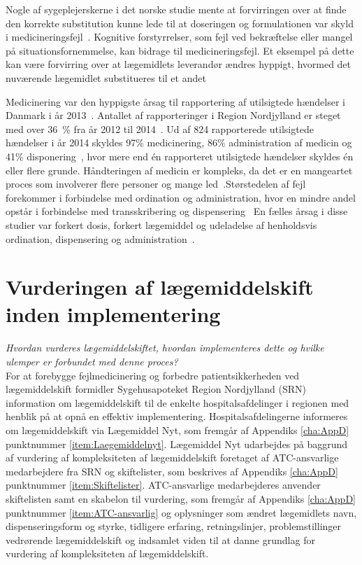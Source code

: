 Nogle af sygeplejerskerne i det norske studie mente at forvirringen over at finde den korrekte substitution kunne lede til at doseringen og formulationen var skyld i medicineringsfejl~\citep{Hakonsen2010}. Kognitive forstyrrelser, som fejl ved bekræftelse eller mangel på situationsfornemmelse, kan bidrage til medicineringsfejl. Et eksempel på dette kan være forvirring over at lægemidlets leverandør ændres hyppigt, hvormed det nuværende lægemidlet substitueres til et andet~\citep{Wittich2014}

Medicinering var den hyppigste årsag til rapportering af utilsigtede hændelser i Danmark i år 2013~\citep{Patientombuddet2013}. Antallet af rapporteringer i Region Nordjylland er steget med over 36~\% fra år 2012 til 2014~\citep{Jensen2014}. Ud af 824 rapporterede utilsigtede hændelser i år 2014 skyldes 97\% medicinering, 86\% administration af medicin og 41\% disponering~\citep{Jensen2014}, hvor mere end én rapporteret utilsigtede hændelser skyldes én eller flere grunde.  Håndteringen af medicin er kompleks, da det er en mangeartet proces som involverer flere personer og mange led~\citep{Barker2002,Sundhedsstyrelsen2005,Lisby2005, Tully2009}.Størstedelen af fejl forekommer i forbindelse med ordination og administration, hvor en mindre andel opstår i forbindelse med transskribering og dispensering~\citep{Agrawal2009, Anderson2002} En fælles årsag i disse studier var forkert dosis, forkert lægemiddel og udeladelse af henholdsvis ordination, dispensering og administration~\citep{Barker2002,Sundhedsstyrelsen2005,Lisby2005, Tully2009}.

\section{Vurderingen af lægemiddelskift inden implementering} \label{sec:ImpLaeg}
\textit{Hvordan vurderes lægemiddelskiftet, hvordan implementeres dette og hvilke ulemper er forbundet med denne proces?} \\
For at forebygge fejlmedicinering og forbedre patientsikkerheden ved lægemiddelskift formidler Sygehusapoteket Region Nordjylland (SRN) information om lægemiddelskift til de enkelte hospitalsafdelinger i regionen med henblik på at opnå en effektiv implementering. Hospitalsafdelingerne informeres om lægemiddelskift via Lægemiddel Nyt, som fremgår af Appendiks \ref{cha:AppD} punktnummer \ref{item:Laegemiddelnyt}. Lægemiddel Nyt udarbejdes på baggrund af vurdering af kompleksiteten af lægemiddelskift foretaget af ATC-ansvarlige medarbejdere fra SRN og skiftelister, som beskrives af Appendiks \ref{cha:AppD} punktnummer \ref{item:Skiftelister}. ATC-ansvarlige medarbejderes anvender skiftelisten samt en skabelon til vurdering, som fremgår af Appendiks \ref{cha:AppD} punktnummer \ref{item:ATC-ansvarlig} og oplysninger som ændret lægemidlets navn, dispenseringsform og styrke, tidligere erfaring, retningslinjer, problemstillinger vedrørende lægemiddelskift og indsamlet viden til at danne grundlag for vurdering af kompleksiteten af lægemiddelskift.

